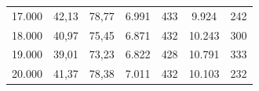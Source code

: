 \begin{table}[ht]
\begin{tabular}{lcccccc}
17.000              & 42,13                                                             & 78,77                                                           & 6.991              & 433               & 9.924              & 242              \\
18.000              & 40,97                                                             & 75,45                                                           & 6.871              & 432               & 10.243             & 300              \\
19.000              & 39,01                                                             & 73,23                                                           & 6.822              & 428               & 10.791             & 333              \\
20.000              & 41,37                                                             & 78,38                                                           & 7.011              & 432               & 10.103             & 232              \\ \hline
\end{tabular}
\end{table}


